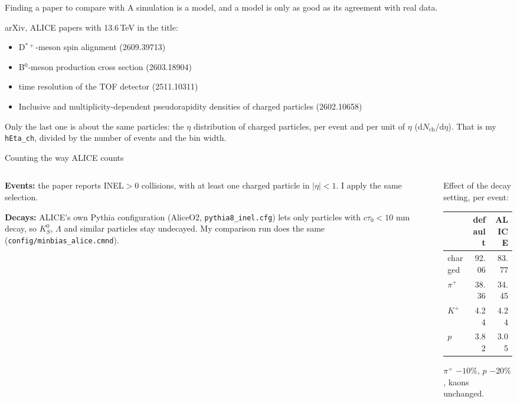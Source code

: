 \documentclass[aspectratio=169,11pt]{beamer}
\newcommand{\dndeta}{\ensuremath{\mathrm{d}N_\mathrm{ch}/\mathrm{d}\eta}}
\begin{document}
\begin{frame}{Finding a paper to compare with}
  A simulation is a model, and a model is only as good as its agreement with real data.

  \vspace{0.5em}
  arXiv, ALICE papers with 13.6\,TeV in the title:
  \small
  \begin{itemize}
    \item D$^{*+}$-meson spin alignment (2609.39713)
    \item B$^0$-meson production cross section (2603.18904)
    \item time resolution of the TOF detector (2511.10311)
    \item \alert{Inclusive and multiplicity-dependent pseudorapidity densities of charged particles} (2602.10658)
  \end{itemize}
  \normalsize
  Only the last one is about the same particles: the $\eta$ distribution of charged particles,
  per event and per unit of $\eta$ (\dndeta). That is my \texttt{hEta\_ch}, divided by the number
  of events and the bin width.
\end{frame}

\begin{frame}{Counting the way ALICE counts}
  \begin{columns}[T]
    \begin{column}{0.5\textwidth}
      \textbf{Events:} the paper reports \alert{INEL$>$0} collisions, with at least one charged
      particle in $|\eta| < 1$. I apply the same selection.

      \vspace{0.8em}
      \textbf{Decays:} ALICE's own Pythia configuration (AliceO2, \texttt{pythia8\_inel.cfg}) lets only
      particles with $c\tau_0 < 10$ mm decay, so $K^0_S$, $\Lambda$ and similar particles stay undecayed.
      My comparison run does the same (\texttt{config/minbias\_alice.cmnd}).
    \end{column}
    \begin{column}{0.45\textwidth}
      \small
      Effect of the decay setting, per event:
      \begin{center}
      \begin{tabular}{lrr}
        \toprule
                  & default & ALICE \\
        \midrule
        charged   & 92.06 & 83.77 \\
        $\pi^+$   & 38.36 & 34.45 \\
        $K^+$     & 4.24  & 4.24 \\
        $p$       & 3.82  & 3.05 \\
        \bottomrule
      \end{tabular}
      \end{center}
      $\pi^+$ $-10\%$, $p$ $-20\%$, kaons unchanged.
    \end{column}
  \end{columns}
\end{frame}
\end{document}
